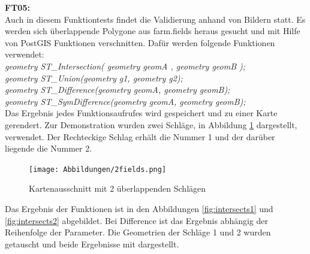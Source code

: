 \textbf{FT05:}\\
Auch in diesem Funktiontests findet die Validierung anhand von Bildern statt.
Es werden sich überlappende Polygone aus farm.fields heraus gesucht und mit Hilfe von PostGIS Funktionen verschnitten.
Dafür werden folgende Funktionen verwendet:\\
\textit{geometry ST\_{}Intersection( geometry geomA , geometry geomB );}\\
\textit{geometry ST\_{}Union(geometry g1, geometry g2);}\\
\textit{geometry ST\_{}Difference(geometry geomA, geometry geomB);}\\
\textit{geometry ST\_{}SymDifference(geometry geomA, geometry geomB);}\\
Das Ergebnis jedes Funktionsaufrufes wird gespeichert und zu einer Karte gerendert.
Zur Demonstration wurden zwei Schläge, in Abbildung \ref{fig:2fields} dargestellt, verwendet.
Der Rechteckige Schlag erhält die Nummer 1 und der darüber liegende die Nummer 2.
\begin{figure}[h!]
\centering
\texttt{[image: Abbildungen/2fields.png]}
\caption[Kartenausschnitt mit 2 überlappenden Schlägen]{Kartenausschnitt mit 2 überlappenden Schlägen}
\label{fig:2fields}
\end{figure}
Das Ergebnis der Funktionen ist in den Abbildungen \ref{fig:intersects1} und \ref{fig:intersects2} abgebildet.
Bei Difference ist das Ergebnis abhängig der Reihenfolge der Parameter.
Die Geometrien der Schläge 1 und 2 wurden getauscht und beide Ergebnisse mit dargestellt.
